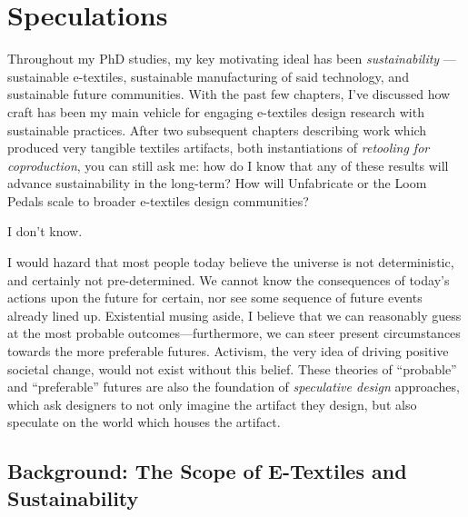 
\chapter{Speculations}
\label{ch_speculations}

Throughout my PhD studies, my key motivating ideal has been \emph{sustainability} --- sustainable e-textiles, sustainable manufacturing of said technology, and sustainable future communities. With the past few chapters, I've discussed how craft has been my main vehicle for engaging e-textiles design research with sustainable practices. After two subsequent chapters describing work which produced very tangible textiles artifacts, both instantiations of \textit{retooling for coproduction}, you can still ask me: how do I know that any of these results will advance sustainability in the long-term? How will Unfabricate or the Loom Pedals scale to broader e-textiles design communities?

I don't know.

I would hazard that most people today believe the universe is not deterministic, and certainly not pre-determined. We cannot know the consequences of today's actions upon the future for certain, nor see some sequence of future events already lined up. Existential musing aside, I believe that we can reasonably guess at the most probable outcomes---furthermore, we can steer present circumstances towards the more preferable futures. Activism, the very idea of driving positive societal change, would not exist without this belief. These theories of ``probable'' and ``preferable'' futures are also the foundation of \textit{speculative design} approaches, which ask designers to not only imagine the artifact they design, but also speculate on the world which houses the artifact.


\section{Background: The Scope of E-Textiles and Sustainability}



